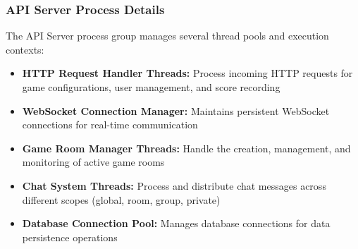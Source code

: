 \subsubsection{API Server Process Details}

The API Server process group manages several thread pools and execution contexts:

\begin{itemize}
    \item \textbf{HTTP Request Handler Threads:} Process incoming HTTP requests for game configurations, user management, and score recording
    \item \textbf{WebSocket Connection Manager:} Maintains persistent WebSocket connections for real-time communication
    \item \textbf{Game Room Manager Threads:} Handle the creation, management, and monitoring of active game rooms
    \item \textbf{Chat System Threads:} Process and distribute chat messages across different scopes (global, room, group, private)
    \item \textbf{Database Connection Pool:} Manages database connections for data persistence operations
\end{itemize}




